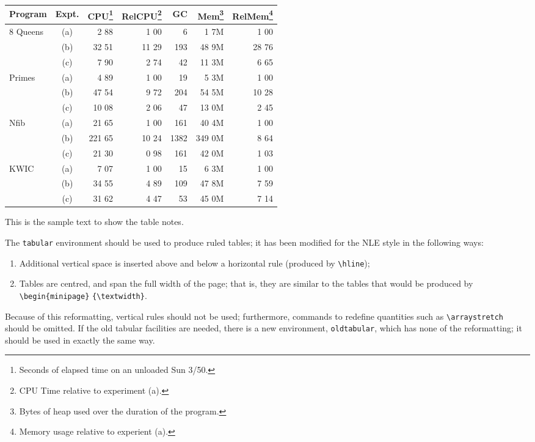 \documentclass{nle}
\begin{document}
\begin{table}[h!]
 {\begin{minipage}{25pc}
    \begin{tabular}{@{\extracolsep{\fill}}lcrrrrr}
    \hline
    Program& Expt.&
     CPU\footnote{Seconds of elapsed time on an unloaded Sun 3/50.}&
     RelCPU\footnote{CPU Time relative to experiment (a).}&
     GC& Mem\footnote{Bytes of heap used over the duration of the program.}&
     RelMem\footnote{Memory usage relative to experient (a).}\\
    \hline
    8 Queens& (a)&   2 88&  1 00&    6&   1 7M&  1 00\\\hdashline
    &         (b)&  32 51& 11 29&  193&  48 9M& 28 76\\\hdashline
    &         (c)&   7 90&  2 74&   42&  11 3M&  6 65\\\hdashline
    Primes&   (a)&   4 89&  1 00&   19&   5 3M&  1 00\\\hdashline
    &         (b)&  47 54&  9 72&  204&  54 5M& 10 28\\\hdashline
    &         (c)&  10 08&  2 06&   47&  13 0M&  2 45\\\hdashline
    Nfib&     (a)&  21 65&  1 00&  161&  40 4M&  1 00\\\hdashline
    &         (b)& 221 65& 10 24& 1382& 349 0M&  8 64\\\hdashline
    &         (c)&  21 30&  0 98&  161&  42 0M&  1 03\\\hdashline
    KWIC&     (a)&   7 07&  1 00&   15&   6 3M&  1 00\\\hdashline
    &         (b)&  34 55&  4 89&  109&  47 8M&  7 59\\\hdashline
    &         (c)&  31 62&  4 47&   53&  45 0M&  7 14\\
    \hline
    \end{tabular}
  \end{minipage}}
  {\begin{tabnote}
  This is the sample text to show the table notes.
  \end{tabnote}}
  \label{sample-table}
\end{table}

The \verb"tabular" environment should be used to produce ruled tables;
it has been modified for the NLE style in the following ways:
\begin{enumerate}
  \item Additional vertical space is inserted above and below a horizontal rule
        (produced by \verb"\hline");
  \item Tables are centred, and span the full width of the page; that is,
  they are similar to the tables that would be produced by
  \verb"\begin{minipage}" \verb"{\textwidth}".
\end{enumerate}
Because of this reformatting, vertical rules should not be used;
furthermore, commands to
redefine quantities such as \verb"\arraystretch" should be omitted. If
the old tabular facilities are needed, there is a new environment,
\verb"oldtabular", which has none of the reformatting; it should be used
in exactly the same way.
\end{document}
